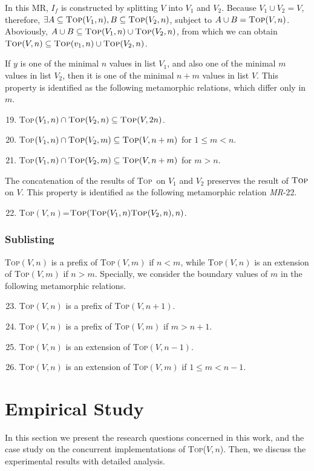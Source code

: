 \documentclass[conference]{IEEEtran}
\theoremstyle{remark}
\newcommand{\Fn}{\textsc{Top}}
\newcommand{\MR}{\textit{MR}}
\begin{document}
In this MR, $I_f$ is constructed by splitting $V$ into $V_1$ and $V_2$. Because $V_1 \cup V_2 = V$, therefore, $\exists A \subseteq \Fn(V_1,n), B \subseteq \Fn(V_2,n)$, subject to $A \cup B = \Fn(V,n)$. Aboviously, $A \cup B \subseteq \Fn(V_1,n) \cup \Fn(V_2,n)$, from which we can obtain $\Fn(V,n) \subseteq \Fn(v_1,n) \cup \Fn(V_2,n)$.


If $y$ is one of the minimal $n$ values in list $V_1$, and also one of the minimal $m$ values in list $V_2$, then it is one of the minimal $n+m$ values in list $V$. This property is identified as the following metamorphic relations, which differ only in $m$.
\begin{enumerate}[\MR-1]
\setcounter{enumi}{18}
\item \Fn$(V_1, n)\cap \Fn(V_2, n)\subseteq \Fn(V, 2n)$.
\item \Fn$(V_1, n)\cap \Fn(V_2, m)\subseteq \Fn(V, n+m)$ for $1\leq m<n$.
\item \Fn$(V_1, n)\cap \Fn(V_2, m)\subseteq \Fn(V, n+m)$ for $m>n$.
\end{enumerate}

The concatenation of the results of \Fn~on $V_1$ and $V_2$ preserves the result of $\Fn$ on $V$. This property is identified as the following metamorphic relation \MR-22.
\begin{enumerate}[\MR-1]
\setcounter{enumi}{21}
\item \Fn$(V,n)$=$\Fn(\Fn(V_1,n)\Fn(V_2,n),n)$.
\end{enumerate}

\subsubsection{Sublisting}
\Fn$(V,n)$ is a prefix of \Fn$(V,m)$ if $n<m$, while \Fn$(V,n)$ is an extension of \Fn$(V,m)$ if $n>m$. Specially, we consider the boundary values of $m$ in the following metamorphic relations.
\begin{enumerate}[\MR-1]
\setcounter{enumi}{22}
\item \Fn$(V,n)$ is a prefix of \Fn$(V,n+1)$.
\item \Fn$(V,n)$ is a prefix of \Fn$(V,m)$ if $m>n+1$.
\item \Fn$(V,n)$ is an extension of \Fn$(V,n-1)$.  
\item \Fn$(V,n)$ is an extension of \Fn$(V,m)$ if $1\leq m<n-1$.  
\end{enumerate}


\section{Empirical Study}
\label{section:empirical}
In this section we present the research questions concerned in this work, and the case study on the concurrent implementations of \Fn($V,n$). Then, we discuss the experimental results with detailed analysis.
\end{document}
